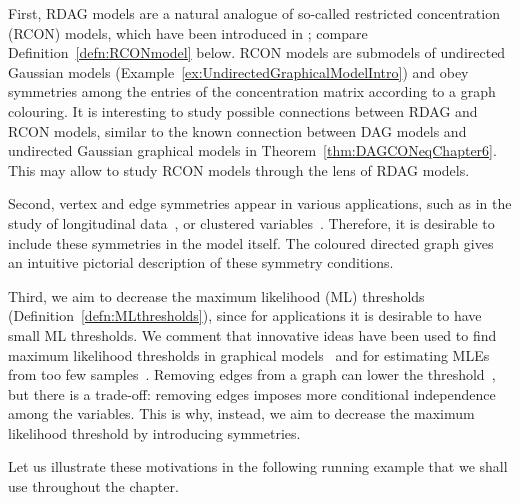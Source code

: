 First, RDAG models are a natural analogue of so-called restricted concentration (RCON) models, which have been introduced in \cite{hojsgaard2008graphical}; compare Definition~\ref{defn:RCONmodel} below. RCON models are submodels of undirected Gaussian models (Example~\ref{ex:UndirectedGraphicalModelIntro}) and obey symmetries among the entries of the concentration matrix according to a graph colouring.
It is interesting to study possible connections between RDAG and RCON models, similar to the known connection between DAG models and undirected Gaussian graphical models in Theorem~\ref{thm:DAGCONeqChapter6}. This may allow to study RCON models through the lens of RDAG models.

Second, vertex and edge symmetries appear in various applications, such as in the study of longitudinal data~\cite{abbruzzo2016operational,vinciotti2016model}, or clustered variables~\cite{gao2015estimation,hojsgaard2008graphical}.
Therefore, it is desirable to include these symmetries in the model itself.
The coloured directed graph gives an intuitive pictorial description of these symmetry conditions.

Third, we aim to decrease the maximum likelihood (ML) thresholds (Definition~\ref{defn:MLthresholds}), since for applications it is desirable to have small ML thresholds. We comment that innovative ideas have been used to find maximum likelihood thresholds in graphical models~\cite{buhl1993existence,drton2019maximum,gross2018maximum,uhler2012geometry} and for estimating MLEs from too few samples~\cite{friedman2008sparse,wille2004sparse}. 
Removing edges from a graph can lower the threshold~\cite{uhler2012geometry, LauritzenBook}, but there is a trade-off: removing edges imposes more conditional independence among the variables. This is why, instead, we aim to decrease the maximum likelihood threshold by introducing symmetries. 

Let us illustrate these motivations in the following running example that we shall use throughout the chapter.

